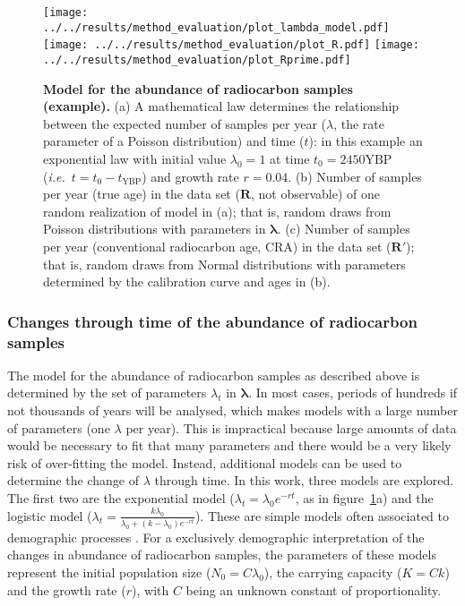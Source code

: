 \documentclass[a4paper]{article}
\begin{document}
\begin{figure}[tbhp]
\center\texttt{[image: ../../results/method\_evaluation/plot\_lambda\_model.pdf]} \texttt{[image: ../../results/method\_evaluation/plot\_R.pdf]} \texttt{[image: ../../results/method\_evaluation/plot\_Rprime.pdf]}
\caption{\textbf{Model for the abundance of radiocarbon samples (example).} (a) A mathematical law determines the relationship between the expected number of samples per year ($\lambda$, the rate parameter of a Poisson distribution) and time ($t$): in this example an exponential law with initial value $\lambda_0=1$ at time $t_0=2450\mathrm{YBP}$ (\emph{i.e.}\ $t=t_0-t_{\mathrm{YBP}}$) and growth rate $r=0.04$. (b) Number of samples per year (true age) in the data set ($\bm{R}$, not observable) of one random realization of model in (a); that is, random draws from Poisson distributions with parameters in $\bm{\lambda}$. (c) Number of samples per year (conventional radiocarbon age, CRA) in the data set ($\bm{R'}$); that is, random draws from Normal distributions with parameters determined by the calibration curve and ages in (b).}
\label{fig:model}
\end{figure}



\subsubsection*{Changes through time of the abundance of radiocarbon samples}

The model for the abundance of radiocarbon samples as described above is determined by the set of parameters $\lambda_t$ in $\bm{\lambda}$. In most cases, periods of hundreds if not thousands of years will be analysed, which makes models with a large number of parameters (one $\lambda$ per year). This is impractical because large amounts of data would be necessary to fit that many parameters and there would be a very likely risk of over-fitting the model. Instead, additional models can be used to determine the change of $\lambda$ through time. In this work, three models are explored. The first two are the exponential model ($\lambda_t = \lambda_0 e^{-rt}$, as in figure~\ref{fig:model}a) and the logistic model ($\lambda_t = \frac{k\lambda_0}{\lambda_0+(k-\lambda_0)e^{-rt}}$). These are simple models often associated to demographic processes \parencite[\emph{e.g.}][]{Bevan2017a}. For a exclusively demographic interpretation of the changes in abundance of radiocarbon samples, the parameters of these models represent the initial population size ($N_0 = C \lambda_0$), the carrying capacity ($K = C k$) and the growth rate ($r$), with $C$ being an unknown constant of proportionality.
\\
\end{document}
